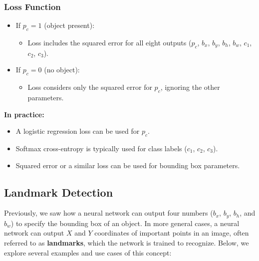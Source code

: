 \documentclass[letterpaper,12pt,notitlepage,twoside]{report}
\begin{document}
\subsubsection*{Loss Function}
\begin{itemize}
    \item If $p_c = 1$ (object present):
    \begin{itemize}
        \item Loss includes the squared error for all eight outputs ($p_c$, $b_x$, $b_y$, $b_h$, $b_w$, $c_1$, $c_2$, $c_3$).
    \end{itemize}
    \item If $p_c = 0$ (no object):
    \begin{itemize}
        \item Loss considers only the squared error for $p_c$, ignoring the other parameters.
    \end{itemize}
\end{itemize}

\textbf{In practice:}
\begin{itemize}[nosep]
    \item A logistic regression loss can be used for $p_c$.
    \item Softmax cross-entropy is typically used for class labels ($c_1$, $c_2$, $c_3$).
    \item Squared error or a similar loss can be used for bounding box parameters.
\end{itemize}

\subsection{Landmark Detection}

Previously, we saw how a neural network can output four numbers (\(b_x\), \(b_y\), \(b_h\), and \(b_w\)) to specify the bounding box of an object. In more general cases, a neural network can output \(X\) and \(Y\) coordinates of important points in an image, often referred to as \textbf{landmarks}, which the network is trained to recognize. Below, we explore several examples and use cases of this concept:
\end{document}
